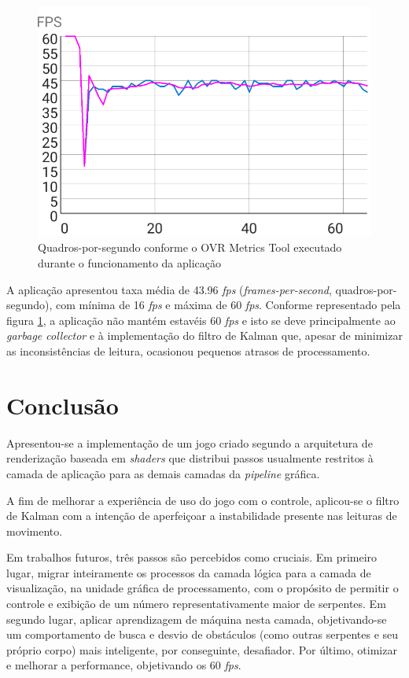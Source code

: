 \documentclass[conference]{IEEEtran}
\begin{document}
\begin{figure}[H] \label{fig:VRPerformanceChart}
\centering
\includegraphics[scale=0.5]{VRPerformance}
\caption{Quadros-por-segundo conforme o OVR Metrics Tool executado durante o funcionamento da aplicação }
\end{figure}

A aplicação apresentou taxa média de 43.96 \textit{fps} (\textit{frames-per-second}, quadros-por-segundo), com mínima de 16 \textit{fps} e máxima de 60 \textit{fps}. Conforme representado pela figura \ref{fig:VRPerformanceChart}, a aplicação não mantém estavéis 60 \textit{fps} e isto se deve principalmente ao \textit{garbage collector} e à implementação do filtro de Kalman que, apesar de minimizar as inconsistências de leitura, ocasionou pequenos atrasos de processamento.

\section{Conclusão}\label{sec:conclusion}
Apresentou-se a implementação de um jogo criado segundo a arquitetura de renderização baseada em \textit{shaders} que distribui passos usualmente restritos à camada de aplicação para as demais camadas da \textit{pipeline} gráfica.

A fim de melhorar a experiência de uso do jogo com o controle, aplicou-se o filtro de Kalman com a intenção de aperfeiçoar a instabilidade presente nas leituras de movimento.

Em trabalhos futuros, três passos são percebidos como cruciais. Em primeiro lugar, migrar inteiramente os processos da camada lógica para a camada de visualização, na unidade gráfica de processamento, com o propósito de permitir o controle e exibição de um número representativamente maior de serpentes. Em segundo lugar, aplicar aprendizagem de máquina nesta camada, objetivando-se um comportamento de busca e desvio de obstáculos (como outras serpentes e seu próprio corpo) mais inteligente, por conseguinte, desafiador. Por último, otimizar e melhorar a performance, objetivando os 60 \textit{fps}.
\end{document}
